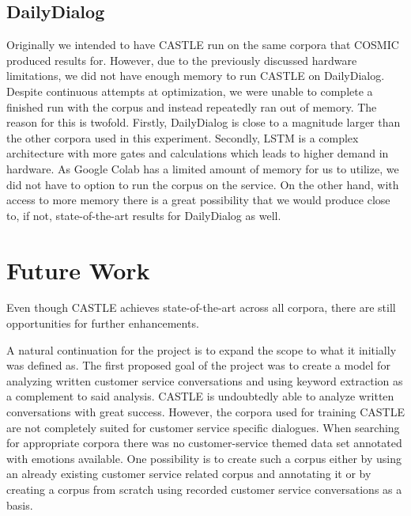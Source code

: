 \documentclass[nofilelist]{cslthse-msc}
\begin{document}
\subsection*{DailyDialog}
Originally we intended to have CASTLE run on the same corpora that COSMIC produced results for. However, due to the previously discussed hardware limitations, we did not have enough memory to run CASTLE on DailyDialog. Despite continuous attempts at optimization, we were unable to complete a finished run with the corpus and instead repeatedly ran out of memory. The reason for this is twofold. Firstly, DailyDialog is close to a magnitude larger than the other corpora used in this experiment. Secondly, LSTM is a complex architecture with more gates and calculations which leads to higher demand in hardware. As Google Colab has a limited amount of memory for us to utilize, we did not have to option to run the corpus on the service. On the other hand, with access to more memory there is a great possibility that we would produce close to, if not, state-of-the-art results for DailyDialog as well. 

\section{Future Work}

Even though CASTLE achieves state-of-the-art across all corpora, there are still opportunities for further enhancements. 

A natural continuation for the project is to expand the scope to what it initially was defined as. The first proposed goal of the project was to create a model for analyzing written customer service conversations and using keyword extraction as a complement to said analysis. CASTLE is undoubtedly able to analyze written conversations with great success. However, the corpora used for training CASTLE are not completely suited for customer service specific dialogues. When searching for appropriate corpora there was no customer-service themed data set annotated with emotions available. One possibility is to create such a corpus either by using an already existing customer service related corpus and annotating it or by creating a corpus from scratch using recorded customer service conversations as a basis. 
\end{document}
